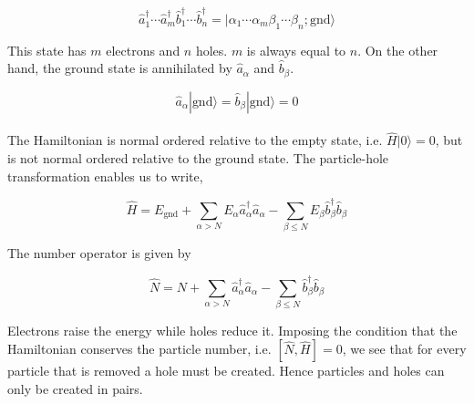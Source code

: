 $$\hat{a}^\dagger_1\cdots\hat{a}^\dagger_m\hat{b}^\dagger_1\cdots\hat{b}^\dagger_n=|\alpha_1\cdots\alpha_m\beta_1\cdots\beta_n;\text{gnd}\rangle$$

\noindent This state has $m$ electrons and $n$ holes. $m$ is always equal to $n$. On the other hand, the ground state is annihilated by $\hat{a}_\alpha$ and $\hat{b}_\beta$.

$$\hat{a}_\alpha|\text{gnd}\rangle=\hat{b}_\beta|\text{gnd}\rangle=0$$\\

\noindent The Hamiltonian is normal ordered relative to the empty state, i.e. $\hat{H}|0\rangle=0$, but is not normal ordered relative to the ground state. The particle-hole transformation enables us to write,

$$\hat{H}=E_\text{gnd}+\sum_{\alpha>N}E_\alpha\hat{a}^\dagger_\alpha\hat{a}_\alpha-\sum_{\beta\leq N}E_\beta\hat{b}^\dagger_\beta\hat{b}_\beta$$

\noindent The number operator is given by

$$\hat{N}=N+\sum_{\alpha>N}\hat{a}^\dagger_\alpha\hat{a}_\alpha-\sum_{\beta\leq N}\hat{b}^\dagger_\beta\hat{b}_\beta$$

\noindent Electrons raise the energy while holes reduce it. Imposing the condition that the Hamiltonian conserves the particle number, i.e. $[\hat{N},\hat{H}]=0$, we see that for every particle that is removed a hole must be created. Hence particles and holes can only be created in pairs.